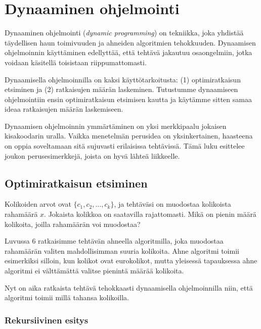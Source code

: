 \chapter{Dynaaminen ohjelmointi}


Dynaaminen ohjelmointi (\textit{dynamic programming})
on tekniikka, joka yhdistää täydellisen haun
toimivuuden ja ahneiden algoritmien tehokkuuden.
Dynaamisen ohjelmoinnin käyttäminen edellyttää,
että tehtävä jakautuu osaongelmiin,
jotka voidaan käsitellä toisistaan riippumattomasti.

Dynaamisella ohjelmoinnilla on kaksi käyttötarkoitusta:
(1) optimiratkaisun etsiminen ja
(2) ratkaisujen määrän laskeminen.
Tutustumme dynaamiseen ohjelmointiin ensin
optimiratkaisun etsimisen kautta ja käytämme sitten
samaa ideaa ratkaisujen määrän laskemiseen.

Dynaamisen ohjelmoinnin ymmärtäminen on yksi merkkipaalu
jokaisen kisakoodarin uralla.
Vaikka menetelmän perusidea on yksinkertainen,
haasteena on oppia soveltamaan sitä sujuvasti
erilaisissa tehtävissä.
Tämä luku esittelee joukon
perusesimerkkejä, joista on hyvä lähteä liikkeelle.

\section{Optimiratkaisun etsiminen}

\begin{task}
Kolikoiden arvot ovat $\{c_1,c_2,\ldots,c_k\}$,
ja tehtäväsi on muodostaa kolikoista rahamäärä $x$.
Jokaista kolikkoa on saatavilla rajattomasti.
Mikä on pienin määrä kolikoita,
joilla rahamäärän voi muodostaa?
\end{task}

Luvussa 6 ratkaisimme tehtävän ahneella algoritmilla,
joka muodostaa rahamäärän valiten mahdollisimman
suuria kolikoita.
Ahne algoritmi toimii esimerkiksi silloin,
kun kolikot ovat eurokolikot,
mutta yleisessä tapauksessa ahne algoritmi
ei välttämättä valitse pienintä määrää kolikoita.

Nyt on aika ratkaista tehtävä tehokkaasti
dynaamisella ohjelmoinnilla niin,
että algoritmi toimii millä tahansa kolikoilla.

\subsection{Rekursiivinen esitys}


